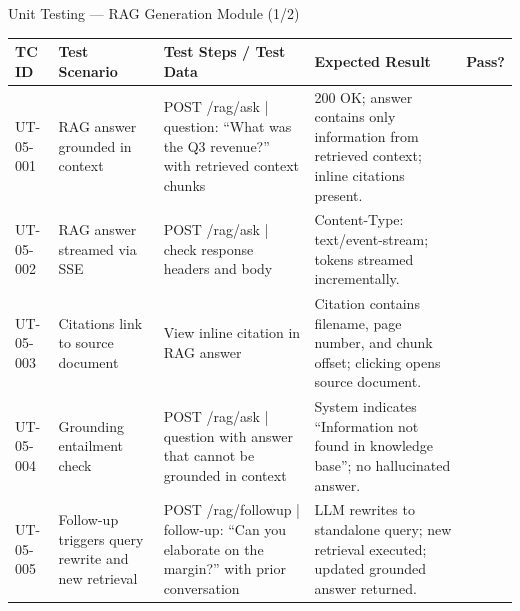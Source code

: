\documentclass[aspectratio=169,xcolor=dvipsnames]{beamer}
\newcommand{\cmark}{\checkmark}
\newcommand{\tw}{\textwidth}
\begin{document}
\begin{frame}{Unit Testing — RAG Generation Module (1/2)}
  \tiny\renewcommand{\arraystretch}{0.88}
  \begin{table}
    \centering
    \setlength{\tabcolsep}{2pt}
    \begin{tabular}{p{.09\tw}|p{.15\tw}|p{.44\tw}|p{.18\tw}|p{.07\tw}}
      \toprule
      \textbf{TC ID} & \textbf{Test Scenario} & \textbf{Test Steps / Test Data} & \textbf{Expected Result} & \textbf{Pass?}\\
      \midrule
      UT-05-001 & RAG answer grounded in context &
        POST /rag/ask | question: ``What was the Q3 revenue?'' with retrieved context chunks &
        200 OK; answer contains only information from retrieved context; inline citations present. & \textcolor{green!60!black}{\cmark}\\
      \midrule
      UT-05-002 & RAG answer streamed via SSE &
        POST /rag/ask | check response headers and body &
        Content-Type: text/event-stream; tokens streamed incrementally. & \textcolor{green!60!black}{\cmark}\\
      \midrule
      UT-05-003 & Citations link to source document &
        View inline citation in RAG answer &
        Citation contains filename, page number, and chunk offset; clicking opens source document. & \textcolor{green!60!black}{\cmark}\\
      \midrule
      UT-05-004 & Grounding entailment check &
        POST /rag/ask | question with answer that cannot be grounded in context &
        System indicates ``Information not found in knowledge base''; no hallucinated answer. & \textcolor{green!60!black}{\cmark}\\
      \midrule
      UT-05-005 & Follow-up triggers query rewrite and new retrieval &
        POST /rag/followup | follow-up: ``Can you elaborate on the margin?'' with prior conversation &
        LLM rewrites to standalone query; new retrieval executed; updated grounded answer returned. & \textcolor{green!60!black}{\cmark}\\
      \bottomrule
    \end{tabular}
  \end{table}
\end{frame}
\end{document}
